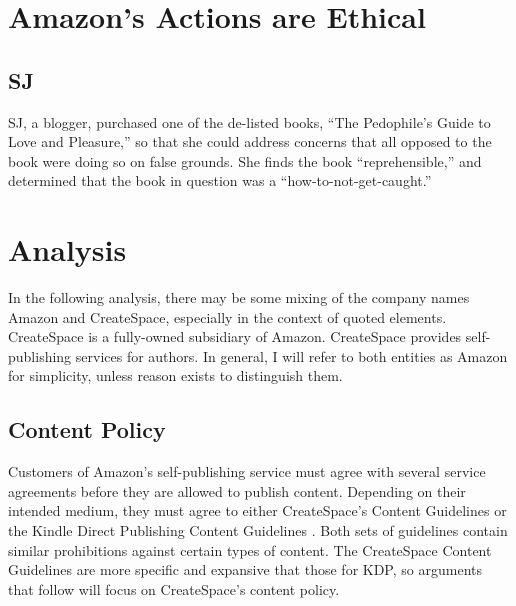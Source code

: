 \documentclass[11pt]{article}
\begin{document}
\begin{multicols}{2}
\section{Amazon's Actions are Ethical}
\subsection{SJ}
SJ, a blogger, purchased one of the de-listed books, ``The Pedophile's Guide to Love and Pleasure,'' so that she could address concerns that all opposed to the book were doing so on false grounds.  She finds the book ``reprehensible,'' and determined that the book in question was a ``how-to-not-get-caught.'' \cite{iasshole}

\section{Analysis}
In the following analysis, there may be some mixing of the company names Amazon and CreateSpace, especially in the context of quoted elements.  CreateSpace is a fully-owned subsidiary of Amazon.  CreateSpace provides self-publishing services for authors.  In general, I will refer to both entities as Amazon for simplicity, unless reason exists to distinguish them.

\subsection{Content Policy}

Customers of Amazon's self-publishing service must agree with several service agreements before they are allowed to publish content.  Depending on their intended medium, they must agree to either CreateSpace's Content Guidelines \cite{CreateSpaceContentGuidelines} or the Kindle Direct Publishing Content Guidelines \cite{AmazonKDPContentGuidelines}.  Both sets of guidelines contain similar prohibitions against certain types of content.  The CreateSpace Content Guidelines are more specific and expansive that those for KDP, so arguments that follow will focus on CreateSpace's content policy.


\end{multicols}
\end{document}
